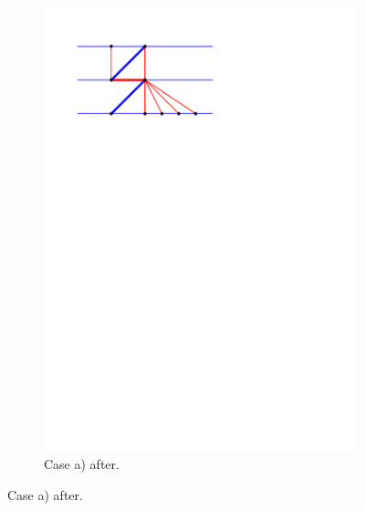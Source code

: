\begin{figure}[!b]
    ~
    \begin{subfigure}[t]{0.45 \textwidth}
        \includegraphics[width =\textwidth]{topFanFlips/img/newFlip/aAfter}
        \caption{Case a) after.}
    \end{subfigure}


\end{figure}
